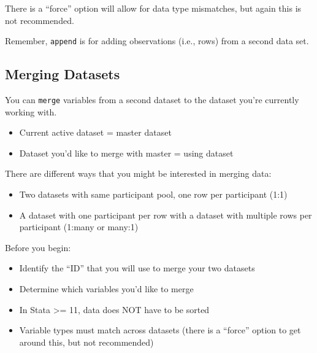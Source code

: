 \documentclass[
]{book}
\providecommand{\tightlist}{%
  \setlength{\itemsep}{0pt}\setlength{\parskip}{0pt}}
\begin{document}
There is a ``force'' option will allow for data type mismatches, but again this is not recommended.

Remember, \texttt{append} is for adding observations (i.e., rows) from a second data set.

\hypertarget{merging-datasets}{%
\subsection{Merging Datasets}\label{merging-datasets}}

You can \texttt{merge} variables from a second dataset to the dataset you're currently working with.

\begin{itemize}
\tightlist
\item
  Current active dataset = master dataset
\item
  Dataset you'd like to merge with master = using dataset
\end{itemize}

There are different ways that you might be interested in merging data:

\begin{itemize}
\tightlist
\item
  Two datasets with same participant pool, one row per participant (1:1)
\item
  A dataset with one participant per row with a dataset with multiple rows per participant (1:many or many:1)
\end{itemize}

Before you begin:

\begin{itemize}
\tightlist
\item
  Identify the ``ID'' that you will use to merge your two datasets
\item
  Determine which variables you'd like to merge
\item
  In Stata \textgreater= 11, data does NOT have to be sorted
\item
  Variable types must match across datasets (there is a ``force'' option to get around this, but not recommended)
\end{itemize}
\end{document}
